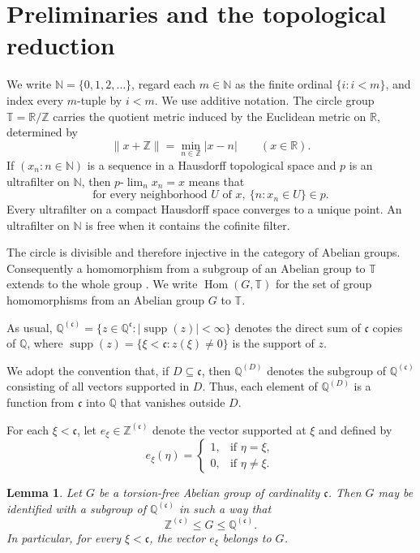 \documentclass[11pt]{amsart}
\newtheorem{lemma}[theorem]{Lemma}
\theoremstyle{definition}
\newcommand{\T}{\mathbb T}
\newcommand{\N}{\mathbb N}
\newcommand{\Z}{\mathbb Z}
\newcommand{\Q}{\mathbb Q}
\newcommand{\cfrak}{\mathfrak c}
\newcommand{\Hom}{\operatorname{Hom}}
\newcommand{\supp}{\operatorname{supp}}
\begin{document}
\section{Preliminaries and the topological reduction}\label{sec:preliminaries}

We write $\N=\{0,1,2,\ldots\}$, regard each $m\in\N$ as the finite ordinal
$\{i:i<m\}$, and index every $m$-tuple by $i<m$.  We use additive notation.
The circle group
$\T=\mathbb R/\mathbb Z$ carries the quotient metric induced by the Euclidean
metric on $\mathbb R$, determined by
\[
 \|x+\mathbb Z\|=\min_{n\in\mathbb Z}|x-n|
 \qquad(x\in\mathbb R).
\]
If $(x_n:n\in\N)$ is a sequence in a Hausdorff topological space and $p$ is
an ultrafilter on $\N$, then
$p\text{-}\lim_n x_n=x$ means that
\[
 \text{for every neighborhood }U\text{ of }x,\ \{n:x_n\in U\}\in p.
\]
Every ultrafilter on a compact Hausdorff space converges to a unique point.
An ultrafilter on $\N$ is free when it
contains the cofinite filter.

The circle is divisible and therefore injective in the category of Abelian
groups.  Consequently a homomorphism from a subgroup of an Abelian group to
$\T$ extends to the whole group
\cite[Theorem~21.1]{Fuchs1970}.
We write $\Hom(G,\T)$ for the set of group homomorphisms from an Abelian
group $G$ to $\T$.

As usual, $\Q^{(\cfrak)}=\{z\in\Q^{\cfrak}:|\supp(z)|<\infty\}$ denotes the
direct sum of $\cfrak$ copies of $\Q$, where
$\supp(z)=\{\xi<\cfrak:z(\xi)\neq0\}$ is the support of $z$.

We adopt the convention that, if $D\subseteq\cfrak$, then $\Q^{(D)}$
denotes the subgroup of $\Q^{(\cfrak)}$ consisting of all vectors supported
in $D$.  Thus, each element of $\Q^{(D)}$ is a function from $\cfrak$ into
$\Q$ that vanishes outside $D$.

For each $\xi<\cfrak$, let $e_\xi\in\Z^{(\cfrak)}$ denote the vector
supported at $\xi$ and defined by
\[
 e_\xi(\eta)=
 \begin{cases}
  1,&\text{if $\eta=\xi$},\\
  0,&\text{if $\eta\neq\xi$}.
 \end{cases}
\]

\begin{lemma}\label{lem:torsion-free-coordinatization}
Let $G$ be a torsion-free Abelian group of cardinality $\cfrak$.  Then $G$ may
be identified with a subgroup of $\Q^{(\cfrak)}$ in such a way that
\[
 \Z^{(\cfrak)}\leq G\leq\Q^{(\cfrak)}.
\]
In particular, for every $\xi<\cfrak$, the vector $e_\xi$ belongs to $G$.
\end{lemma}
\end{document}

